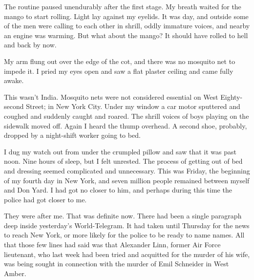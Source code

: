 \documentclass{novel}
\begin{document}
\vspace{2\nbs}
\clearpage
\thispagestyle{empty}


\begin{ChapterStart}
\vspace{3\nbs}
\end{ChapterStart}

The routine paused unendurably after the first stage. My breath waited for the mango to start rolling. Light lay against my eyelids. It was day, and outside some of the men were calling to each other in shrill, oddly immature voices, and nearby an engine was warming. But what about the mango? It should have rolled to hell and back by now.

My arm flung out over the edge of the cot, and there was no mosquito net to impede it. I pried my eyes open and saw a flat plaster ceiling and came fully awake.

This wasn’t India. Mosquito nets were not considered essential on West Eighty-second Street; in New York City. Under my window a car motor sputtered and coughed and suddenly caught and roared. The shrill voices of boys playing on the sidewalk moved off. Again I heard the thump overhead. A second shoe, probably, dropped by a night-shift worker going to bed.

I dug my watch out from under the crumpled pillow and saw that it was past noon. Nine hours of sleep, but I felt unrested. The process of getting out of bed and dressing seemed complicated and unnecessary. This was Friday, the beginning of my fourth day in New York, and seven million people remained between myself and Don Yard. I had got no closer to him, and perhaps during this time the police had got closer to me.

They were after me. That was definite now. There had been a single paragraph deep inside yesterday’s World-Telegram. It had taken until Thursday for the news to reach New York, or more likely for the police to be ready to name names. All that those few lines had said was that Alexander Linn, former Air Force lieutenant, who last week had been tried and acquitted for the murder of his wife, was being sought in connection with the murder of Emil Schneider in West Amber.
\end{document}
